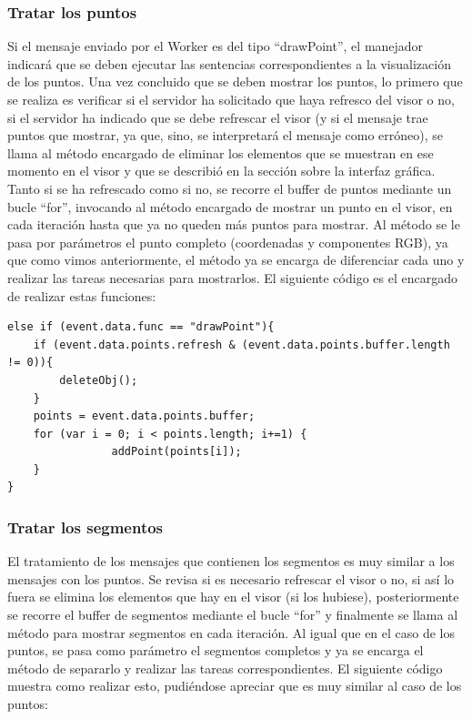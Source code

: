 \subsubsection{Tratar los puntos}
Si el mensaje enviado por el Worker es del tipo ``drawPoint'', el manejador indicará que se deben ejecutar las sentencias correspondientes a la visualización de los puntos. Una vez concluido que se deben mostrar los puntos, lo primero que se realiza es verificar si el servidor ha solicitado que haya refresco del visor o no, si el servidor ha indicado 	que se debe refrescar el visor (y si el mensaje trae puntos que mostrar, ya que, sino, se interpretará el mensaje como erróneo), se llama al método encargado de eliminar los elementos que se muestran en ese momento en el visor y que se describió en la sección sobre la interfaz gráfica. Tanto si se ha refrescado como si no, se recorre el buffer de puntos mediante un bucle ``for'', invocando al método encargado de mostrar un punto en el visor, en cada iteración hasta que ya no queden más puntos para mostrar. Al método se le pasa por parámetros el punto completo (coordenadas y componentes RGB), ya que como vimos anteriormente, el método ya se encarga de diferenciar cada uno y realizar las tareas necesarias para mostrarlos. El siguiente código es el encargado de realizar estas funciones:

\begin{lstlisting}[frame=single]
else if (event.data.func == "drawPoint"){
	if (event.data.points.refresh & (event.data.points.buffer.length != 0)){
		deleteObj();
	}
	points = event.data.points.buffer;
	for (var i = 0; i < points.length; i+=1) {
        		addPoint(points[i]);
	}
}
\end{lstlisting}

\subsubsection{Tratar los segmentos}
El tratamiento de los mensajes que contienen los segmentos es muy similar a los mensajes con los puntos. Se revisa si es necesario refrescar el visor o no, si así lo fuera se elimina los elementos que hay en el visor (si los hubiese), posteriormente se recorre el buffer de segmentos mediante el bucle ``for'' y finalmente se llama al método para mostrar segmentos en cada iteración. Al igual que en el caso de los puntos, se pasa como parámetro el segmentos completos y ya se encarga el método de separarlo y realizar las tareas correspondientes. El siguiente código muestra como realizar esto, pudiéndose apreciar que es muy similar al caso de los puntos:

